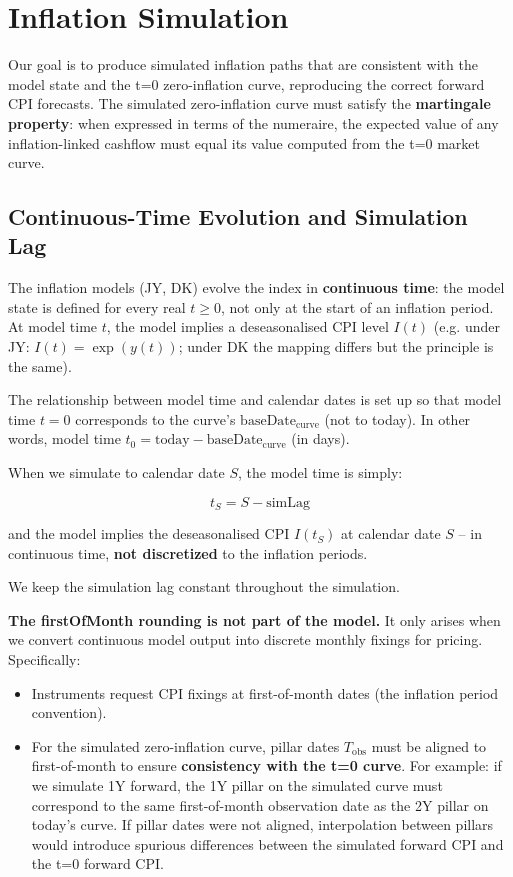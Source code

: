 \documentclass[11pt,a4paper]{article}
\begin{document}
\section{Inflation Simulation}

Our goal is to produce simulated inflation paths that are consistent with the model state and the t=0 zero-inflation curve, reproducing the correct forward CPI forecasts. The simulated zero-inflation curve must satisfy the \textbf{martingale property}: when expressed in terms of the numeraire, the expected value of any inflation-linked cashflow must equal its value computed from the t=0 market curve.

\subsection{Continuous-Time Evolution and Simulation Lag}

The inflation models (JY, DK) evolve the index in \textbf{continuous time}: the model state is defined for every real $t \geq 0$, not only at the start of an inflation period. At model time $t$, the model implies a deseasonalised CPI level $I(t)$ (e.g. under JY: $I(t) = \exp(y(t))$; under DK the mapping differs but the principle is the same).

The relationship between model time and calendar dates is set up so that model time $t = 0$ corresponds to the curve's $\text{baseDate}_{\text{curve}}$ (not to today). In other words, model time $t_0 = \text{today} - \text{baseDate}_{\text{curve}}$ (in days).

When we simulate to calendar date $S$, the model time is simply:

\begin{equation}
t_S = S - \text{simLag}
\end{equation}

and the model implies the deseasonalised CPI $I(t_S)$ at calendar date $S$ -- in continuous time, \textbf{not discretized} to the inflation periods.

We keep the simulation lag constant throughout the simulation.

\textbf{The firstOfMonth rounding is not part of the model.} It only arises when we convert continuous model output into discrete monthly fixings for pricing. Specifically:
\begin{itemize}
\item Instruments request CPI fixings at first-of-month dates (the inflation period convention).
\item For the simulated zero-inflation curve, pillar dates $T_{\text{obs}}$ must be aligned to first-of-month to ensure \textbf{consistency with the t=0 curve}. For example: if we simulate 1Y forward, the 1Y pillar on the simulated curve must correspond to the same first-of-month observation date as the 2Y pillar on today's curve. If pillar dates were not aligned, interpolation between pillars would introduce spurious differences between the simulated forward CPI and the t=0 forward CPI.
\end{itemize}
\end{document}
